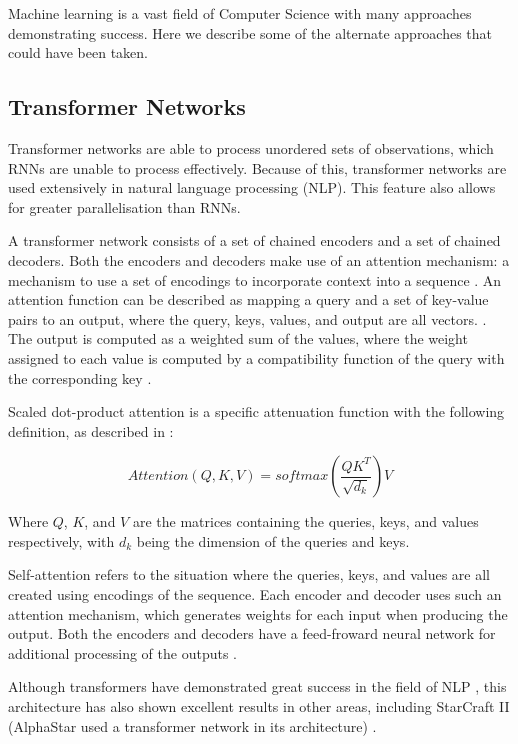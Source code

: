 Machine learning is a vast field of Computer Science with many approaches demonstrating success. Here we describe some of the alternate approaches that could have been taken.

\subsection{Transformer Networks}

Transformer networks are able to process unordered sets of observations, which RNNs are unable to process effectively. Because of this, transformer networks are used extensively in natural language processing (NLP). This feature also allows for greater parallelisation than RNNs.

A transformer network consists of a set of chained encoders and a set of chained decoders. Both the encoders and decoders make use of an attention mechanism: a mechanism to use a set of encodings to incorporate context into a sequence \cite{illustratedtransformer}. An attention function can be described as mapping a query and a set of key-value pairs to an output, where the query, keys, values, and output are all vectors. \cite{attention}. The output is computed as a weighted sum of the values, where the weight assigned to each value is computed by a compatibility function of the query with the corresponding key \cite{attention}.

Scaled dot-product attention is a specific attenuation function with the following definition, as described in \cite{attention}:

\[
Attention(Q,K,V)=softmax(\frac{QK^T}{\sqrt{d_k}})V
\]

Where $Q$, $K$, and $V$ are the matrices containing the queries, keys, and values respectively, with $d_k$ being the dimension of the queries and keys.

Self-attention refers to the situation where the queries, keys, and values are all created using encodings of the sequence. Each encoder and decoder uses such an attention mechanism, which generates weights for each input when producing the output. Both the encoders and decoders have a feed-froward neural network for additional processing of the outputs \cite{illustratedtransformer}.

Although transformers have demonstrated great success in the field of NLP \cite{attention}, this architecture has also shown excellent results in other areas, including StarCraft II (AlphaStar used a transformer network in its architecture) \cite{alphastar}.

